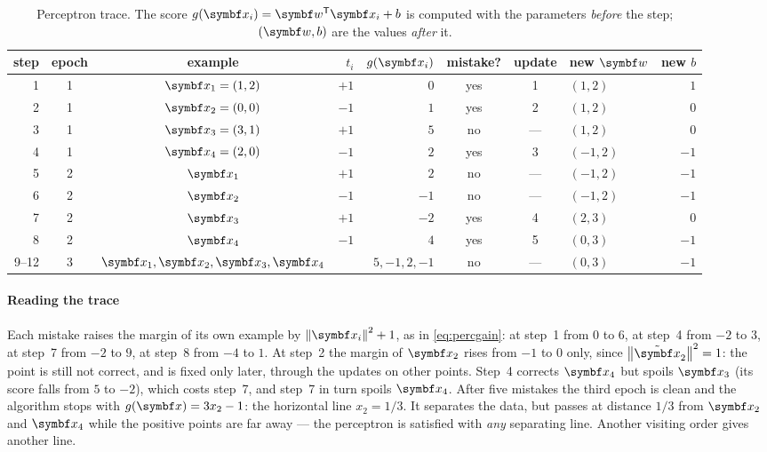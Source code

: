 \documentclass[11pt]{article}
\newcommand{\w}{\vect{w}}
\newcommand{\xt}{\tilde{\x}}
\begin{document}
\begin{table}[h]
\centering\small
\caption{Perceptron trace. The score $g(\x_i) = \w\T\x_i + b$ is computed with the parameters \emph{before} the step;
$(\w, b)$ are the values \emph{after} it.}
\label{tab:trace}
\begin{tabular}{@{}rccrrcclr@{}}
\toprule
step & epoch & example & $t_i$ & $g(\x_i)$ & mistake? & update & new $\w$ & new $b$ \\
\midrule
1 & 1 & $\x_1 = (1, 2)$ & $+1$ & $0$ & yes & 1 & $(1, 2)$ & $1$ \\
2 & 1 & $\x_2 = (0, 0)$ & $-1$ & $1$ & yes & 2 & $(1, 2)$ & $0$ \\
3 & 1 & $\x_3 = (3, 1)$ & $+1$ & $5$ & no & --- & $(1, 2)$ & $0$ \\
4 & 1 & $\x_4 = (2, 0)$ & $-1$ & $2$ & yes & 3 & $(-1, 2)$ & $-1$ \\
5 & 2 & $\x_1$ & $+1$ & $2$ & no & --- & $(-1, 2)$ & $-1$ \\
6 & 2 & $\x_2$ & $-1$ & $-1$ & no & --- & $(-1, 2)$ & $-1$ \\
7 & 2 & $\x_3$ & $+1$ & $-2$ & yes & 4 & $(2, 3)$ & $0$ \\
8 & 2 & $\x_4$ & $-1$ & $4$ & yes & 5 & $(0, 3)$ & $-1$ \\
9--12 & 3 & $\x_1, \x_2, \x_3, \x_4$ & & $5, -1, 2, -1$ & no & --- & $(0, 3)$ & $-1$ \\
\bottomrule
\end{tabular}
\end{table}

\paragraph{Reading the trace} Each mistake raises the margin of its own example by $\norm{\x_i}^2 + 1$, as in
\eqref{eq:percgain}: at step~1 from $0$ to $6$, at step~4 from $-2$ to $3$, at step~7 from $-2$ to $9$, at step~8 from
$-4$ to $1$. At step~2 the margin of $\x_2$ rises from $-1$ to $0$ only, since $\norm{\xt_2}^2 = 1$: the point is still not
correct, and is fixed only later, through the updates on other points. Step~4 corrects $\x_4$ but spoils $\x_3$
(its score falls from $5$ to $-2$), which costs step~7, and step~7 in turn spoils $\x_4$. After five mistakes the third
epoch is clean and the algorithm stops with $g(\x) = 3x_2 - 1$: the horizontal line $x_2 = 1/3$. It separates the data, but
passes at distance $1/3$ from $\x_2$ and $\x_4$ while the positive points are far away --- the perceptron is satisfied with
\emph{any} separating line. Another visiting order gives another line.
\end{document}
